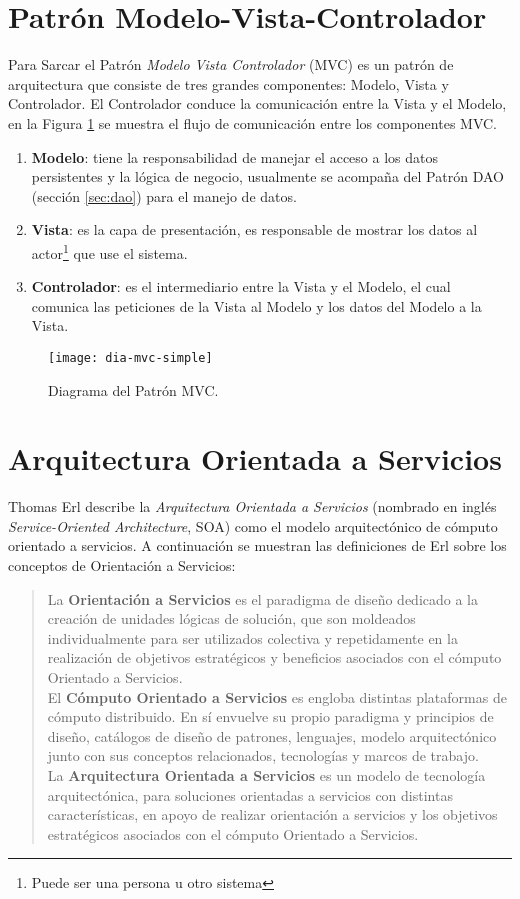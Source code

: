 \section{Patrón Modelo-Vista-Controlador}\label{sec:mvc}
Para Sarcar\cite{JavaDesignPatternsExamples} el Patrón \textit{Modelo Vista Controlador} (MVC) es un patrón de arquitectura que consiste de tres grandes componentes: Modelo, Vista y Controlador. El Controlador conduce la comunicación entre la Vista y el Modelo, en la Figura \ref{fig:dia-mvc-simple} se muestra el flujo de comunicación entre los componentes MVC.
\begin{enumerate}
	\item \textbf{Modelo}: tiene la responsabilidad de manejar el acceso a los datos persistentes y la lógica de negocio, usualmente se acompaña del Patrón DAO (sección \ref{sec:dao}) para el manejo de datos.
	\item \textbf{Vista}: es la capa de presentación, es responsable de mostrar los datos al actor\footnote{Puede ser una persona u otro sistema} que use el sistema.
	\item \textbf{Controlador}: es el intermediario entre la Vista y el Modelo, el cual comunica las peticiones de la Vista al Modelo y los datos del Modelo a la Vista.
\end{enumerate}
\begin{figure}[h]
  \centering
  \texttt{[image: dia-mvc-simple]}
  \caption{Diagrama del Patrón MVC\cite{JavaDesignPatternsExamples}.}
  \label{fig:dia-mvc-simple}
\end{figure}

\section{Arquitectura Orientada a Servicios}\label{sec:soa}
Thomas Erl describe la \textit{Arquitectura Orientada a Servicios} (nombrado en inglés \textit{Service-Oriented Architecture}, SOA) como el modelo arquitectónico de cómputo orientado a servicios\cite{SOAWithRest}. A continuación se muestran las definiciones de Erl\cite{SOAWithRest} sobre los conceptos de Orientación a Servicios:
\begin{quote}
La \textbf{Orientación a Servicios} es el paradigma de diseño dedicado a la creación de unidades lógicas de solución, que son moldeados individualmente para ser utilizados colectiva y repetidamente en la realización de objetivos estratégicos y beneficios asociados con el cómputo Orientado a Servicios.\\
El \textbf{Cómputo Orientado a Servicios} es engloba distintas plataformas de cómputo distribuido. En sí envuelve su propio paradigma y principios de diseño, catálogos de diseño de patrones, lenguajes, modelo arquitectónico junto con sus conceptos relacionados, tecnologías y marcos de trabajo.\\
La \textbf{Arquitectura Orientada a Servicios} es un modelo de tecnología arquitectónica, para soluciones orientadas a servicios con distintas características, en apoyo de realizar orientación a servicios y los objetivos estratégicos asociados con el cómputo Orientado a Servicios.
\end{quote}
